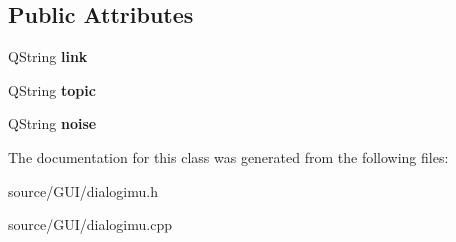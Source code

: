 \subsection*{Public Attributes}
\begin{DoxyCompactItemize}
\item 
Q\+String {\bfseries link}\label{class_dialog_i_m_u_a5aaebbbffb76116311960a3082d84f7d}

\item 
Q\+String {\bfseries topic}\label{class_dialog_i_m_u_a9c3a470f6b2d10343f455de0068062c1}

\item 
Q\+String {\bfseries noise}\label{class_dialog_i_m_u_ae1cfecd4271662374ba4ae539bae3dfe}

\end{DoxyCompactItemize}


The documentation for this class was generated from the following files\+:\begin{DoxyCompactItemize}
\item 
source/\+G\+U\+I/dialogimu.\+h\item 
source/\+G\+U\+I/dialogimu.\+cpp\end{DoxyCompactItemize}
